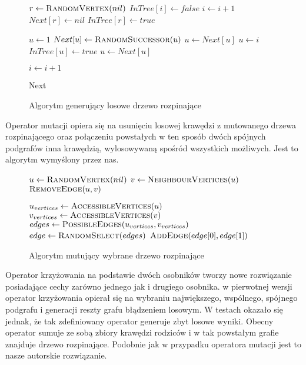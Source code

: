 \documentclass[12pt]{article}
\begin{document}
\begin{figure}[h!]
 \centering
\begin{algorithmic}
\State $r\gets \Call{RandomVertex}{nil}$
    \State $InTree[i] \gets false $
    \State $i\gets i+1$
\EndFor
\State $Next[r] \gets nil $
\State $InTree[r] \gets true $


    \State $u \gets 1 $
        \State $Next[u] \gets \Call{RandomSuccessor}{u}$
        \State $u \gets Next[u]$
    \EndWhile
    \State $u\gets i$
        \State $InTree[u] \gets true$
        \State $u \gets Next[u]$
    \EndWhile
   
    \State $i\gets i+1$
\EndFor


\Return Next

\EndFunction

\end{algorithmic}
\caption{Algorytm generujący losowe drzewo rozpinające}
\end{figure}


Operator mutacji opiera się na usunięciu losowej krawędzi z mutowanego drzewa rozpinającego oraz połączeniu powstałych w ten sposób dwóch spójnych podgrafów inna krawędzią, wylosowywaną spośród wszystkich możliwych. Jest to algorytm wymyślony przez nas.


\begin{figure}[h!]
 \centering
\begin{algorithmic}
\State $u\gets \Call{RandomVertex}{nil}$
\State $v\gets \Call{NeighbourVertices}{u}$
\State $\Call{RemoveEdge}{u,v}$

\State $u_{vertices}\gets \Call{AccessibleVertices}{u}$
\State $v_{vertices}\gets \Call{AccessibleVertices}{v}$
\State $edges \gets \Call{PossibleEdges}{u_{vertices}, v_{vertices}}$
\State $edge \gets \Call{RandomSelect}{edges}$
\State $\Call{AddEdge}{edge[0],edge[1]}$

\EndFunction

\end{algorithmic}
\caption{Algorytm mutujący wybrane drzewo rozpinające}
\end{figure}
 
 
Operator krzyżowania na podstawie dwóch osobników tworzy nowe rozwiązanie posiadające cechy zarówno jednego jak i drugiego osobnika. w pierwotnej wersji operator krzyżowania opierał się na wybraniu największego, wspólnego, spójnego podgrafu i generacji reszty grafu błądzeniem losowym. W testach okazało się jednak, że tak zdefiniowany operator generuje zbyt losowe wyniki. Obecny operator sumuje ze sobą zbiory krawędzi rodziców i w tak powstałym grafie znajduje drzewo rozpinające. Podobnie jak w przypadku operatora mutacji jest to nasze autorskie rozwiązanie.
 
\end{document}
